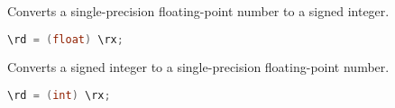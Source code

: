 %

Converts a single-precision floating-point number to a signed integer.

\begin{lstlisting}[numbers=none, basicstyle=\ttfamily\footnotesize, language=C++]
\rd = (float) \rx;
\end{lstlisting}

Converts a signed integer to a single-precision floating-point number.

\begin{lstlisting}[numbers=none, basicstyle=\ttfamily\footnotesize, language=C++]
\rd = (int) \rx;
\end{lstlisting}
